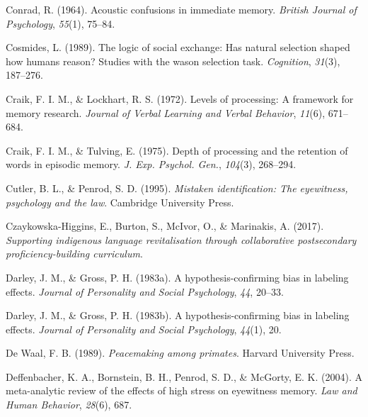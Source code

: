 \documentclass[
]{krantz}
\newlength{\cslhangindent}
\newlength{\cslentryspacingunit} %
\newenvironment{CSLReferences}[2] %
 {%
  \setlength{\parindent}{0pt}
  \ifodd #1
  \let\oldpar\par
  \def\par{\hangindent=\cslhangindent\oldpar}
  \fi
  \setlength{\parskip}{#2\cslentryspacingunit}
 }%
 {}
\begin{document}
\begin{CSLReferences}{1}{0}
\leavevmode{}%
Conrad, R. (1964). Acoustic confusions in immediate memory. \emph{British Journal of Psychology}, \emph{55}(1), 75--84.

\leavevmode{}%
Cosmides, L. (1989). The logic of social exchange: Has natural selection shaped how humans reason? Studies with the wason selection task. \emph{Cognition}, \emph{31}(3), 187--276.

\leavevmode{}%
Craik, F. I. M., \& Lockhart, R. S. (1972). Levels of processing: A framework for memory research. \emph{Journal of Verbal Learning and Verbal Behavior}, \emph{11}(6), 671--684.

\leavevmode{}%
Craik, F. I. M., \& Tulving, E. (1975). Depth of processing and the retention of words in episodic memory. \emph{J. Exp. Psychol. Gen.}, \emph{104}(3), 268--294.

\leavevmode{}%
Cutler, B. L., \& Penrod, S. D. (1995). \emph{Mistaken identification: The eyewitness, psychology and the law}. Cambridge University Press.

\leavevmode{}%
Czaykowska-Higgins, E., Burton, S., McIvor, O., \& Marinakis, A. (2017). \emph{Supporting indigenous language revitalisation through collaborative postsecondary proficiency-building curriculum}.

\leavevmode{}%
Darley, J. M., \& Gross, P. H. (1983a). A hypothesis-confirming bias in labeling effects. \emph{Journal of Personality and Social Psychology}, \emph{44}, 20--33.

\leavevmode{}%
Darley, J. M., \& Gross, P. H. (1983b). A hypothesis-confirming bias in labeling effects. \emph{Journal of Personality and Social Psychology}, \emph{44}(1), 20.

\leavevmode{}%
De Waal, F. B. (1989). \emph{Peacemaking among primates}. Harvard University Press.

\leavevmode{}%
Deffenbacher, K. A., Bornstein, B. H., Penrod, S. D., \& McGorty, E. K. (2004). A meta-analytic review of the effects of high stress on eyewitness memory. \emph{Law and Human Behavior}, \emph{28}(6), 687.


\end{CSLReferences}
\end{document}
